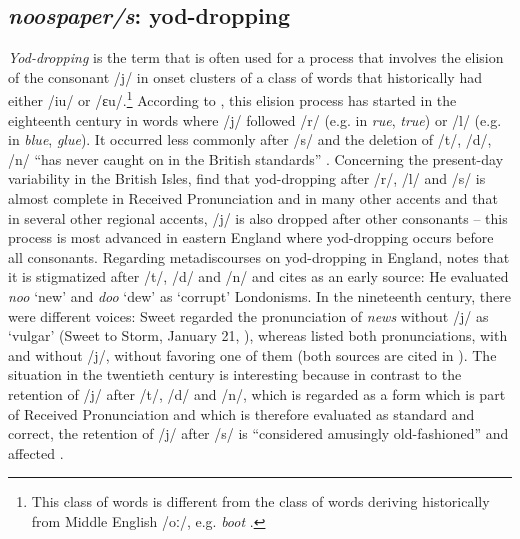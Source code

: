 \subsection{\emph{noospaper/s}: yod-dropping}
\hypertarget{Toc63021224}{}
\textit{Yod-dropping} is the term that is often used for a process that involves the elision of the consonant /j/ in onset clusters of a class of words that historically had either /iu/ or /ɛu/.\footnote{This class of words is different from the class of words deriving historically from Middle English /oː/, e.g. \emph{boot} \citep[87]{Lass2006}.}  According to \citet[88]{Lass2006}, this elision process has started  in the eighteenth century in words where /j/ followed /r/ (e.g. in \emph{rue}, \emph{true}) or /l/ (e.g. in \emph{blue}, \emph{glue}). It occurred less commonly after /s/ and the deletion of /t/, /d/, /n/ “has never caught on in the British standards” \citep[88]{Lass2006}. Concerning the present-day variability in the British Isles, \citet[68--69]{Hughes2012} find that yod-dropping after /r/, /l/ and /s/ is almost complete in Received Pronunciation and in many other accents and that in several other regional accents, /j/ is also dropped after other consonants – this process is most advanced in eastern England where yod-dropping occurs before all consonants. Regarding metadiscourses on yod-dropping in England, \citet[88]{Lass2006} notes that it is stigmatized after /t/, /d/ and /n/ and cites \citet{Walker1791} as an early source: He evaluated \emph{noo} ‘new’ and \emph{doo} ‘dew’ as ‘corrupt’ Londonisms. In the nineteenth century, there were different voices: Sweet regarded the pronunciation of \emph{news} without /j/ as ‘vulgar’ (Sweet to Storm, January 21, \citeyear{Sweet1889}), whereas \citet[601]{Ellis1869} listed both pronunciations, with and without /j/, without favoring one of them (both sources are cited in \citealt[473]{MacMahon1998}). The situation in the twentieth century is interesting because in contrast to the retention of /j/ after /t/, /d/ and /n/, which is regarded as a form which is part of Received Pronunciation and which is therefore evaluated as standard and correct, the retention of /j/ after /s/ is “considered amusingly old-fashioned” and affected \citep[69]{Hughes2012}.

